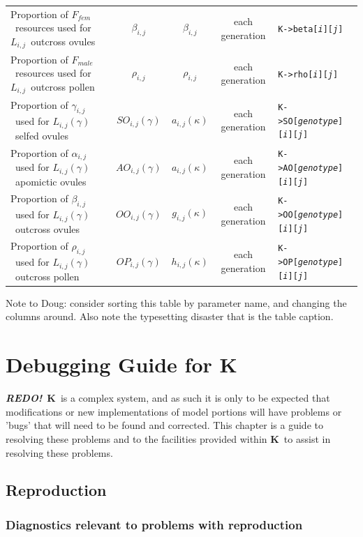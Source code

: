 \documentclass[12pt,twoside,letterpaper,fleqn]{report}
\numberwithin{equation}{section}  %
\newcommand{\REDO}{{\bf {\em REDO!}}}
\newcommand{\K}{{\bf K}}
\newcommand{\Kmemberij}[3]{\mbox{{\tt K->#1[{\it #2}\/][{\it #3}\/]}}}
\newcommand{\Kmemberijk}[4]{\mbox{{\tt K->#1[{\it #2}\/][{\it #3}\/][{\it #4}\/]}}}
\newcommand{\Lij}{\mbox{$L_{i,j}$}}              %
\newcommand{\Lgij}{\mbox{$L_{i,j}(\gamma)$}}     %
\newcommand{\Ffemale}{\mbox{$F_{fem}$}}
\newcommand{\Fmale}{\mbox{$F_{male}$}}
\newcommand{\betaij}{\mbox{$\beta_{i,j}$}}
\newcommand{\gammaij}{\mbox{$\gamma_{i,j}$}}
\newcommand{\alphaij}{\mbox{$\alpha_{i,j}$}}
\newcommand{\rhoij}{\mbox{$\rho_{i,j}$}}
\newcommand{\SOijg}{\mbox{$SO_{i,j}(\gamma)$}}
\newcommand{\AOijg}{\mbox{$AO_{i,j}(\gamma)$}}
\newcommand{\OOijg}{\mbox{$OO_{i,j}(\gamma)$}}
\newcommand{\OPijg}{\mbox{$OP_{i,j}(\gamma)$}}
\begin{document}
{\begin{landscape}
\begin{longtable}{p{2in}|c|c|c|l}
Proportion of \Ffemale\ resources used for \Lij\ outcross ovules	&	\betaij	&	\betaij				& each generation & \Kmemberij{beta}{i}{j} \\
Proportion of \Fmale\ resources used for \Lij\ outcross pollen	&	\rhoij	&	\rhoij				& each generation & \Kmemberij{rho}{i}{j} \\
Proportion of \gammaij\ used for \Lgij\ selfed ovules &	\SOijg	&	$a_{i,j}(\kappa)$\dag	& each generation & \Kmemberijk{SO}{genotype}{i}{j} \\
Proportion of \alphaij\ used for \Lgij\ apomictic ovules &	\AOijg	&	$a_{i,j}(\kappa)$\dag	& each generation & \Kmemberijk{AO}{genotype}{i}{j} \\
Proportion of \betaij\ used for \Lgij\ outcross ovules &	\OOijg	&	$g_{i,j}(\kappa)$	& each generation & \Kmemberijk{OO}{genotype}{i}{j} \\
Proportion of \rhoij\ used for \Lgij\ outcross pollen &	\OPijg	&	$h_{i,j}(\kappa)$	& each generation & \Kmemberijk{OP}{genotype}{i}{j} \\
\end{longtable}

\end{landscape}

Note to Doug: consider sorting this table by parameter name, and changing the columns around.  Also note the typesetting disaster that is the table caption.

\chapter{Debugging Guide for \K}

\REDO\  \K\ is a complex system, and as such it is only to be expected that modifications or new implementations of model portions will have problems or 'bugs' that will need to be found and corrected.  This chapter is a guide to resolving these problems and to the facilities provided within \K\ to assist in resolving these problems.

\section{Reproduction}

\subsection{Diagnostics relevant to problems with reproduction}

}
\end{document}
